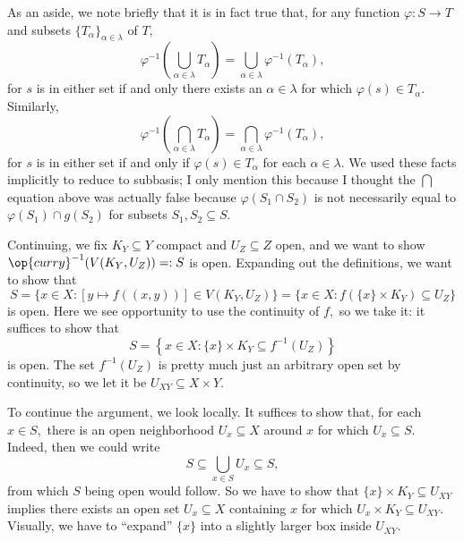 As an aside, we note briefly that it is in fact true that, for any function $\varphi:S\to T$ and subsets $\{T_\alpha\}_{\alpha\in\lambda}$ of $T,$
\[\varphi^{-1}\left(\bigcup_{\alpha\in\lambda}T_\alpha\right)=\bigcup_{\alpha\in\lambda}\varphi^{-1}(T_\alpha),\]
for $s$ is in either set if and only there exists an $\alpha\in\lambda$ for which $\varphi(s)\in T_\alpha.$ Similarly,
\[\varphi^{-1}\left(\bigcap_{\alpha\in\lambda}T_\alpha\right)=\bigcap_{\alpha\in\lambda}\varphi^{-1}(T_\alpha),\]
for $s$ is in either set if and only if $\varphi(s)\in T_\alpha$ for each $\alpha\in\lambda.$ We used these facts implicitly to reduce to subbasis; I only mention this because I thought the $\bigcap$ equation above was actually false because $\varphi(S_1\cap S_2)$ is not necessarily equal to $\varphi(S_1)\cap g(S_2)$ for subsets $S_1,S_2\subseteq S.$

Continuing, we fix $K_Y\subseteq Y$ compact and $U_Z\subseteq Z$ open, and we want to show $\op{curry}^{-1}(V(K_Y,U_Z))=:S$ is open. Expanding out the definitions, we want to show that
\[S=\{x\in X:[y\mapsto f((x,y))]\in V(K_Y,U_Z)\}=\{x\in X:f(\{x\}\times K_Y)\subseteq U_Z\}\]
is open. Here we see opportunity to use the continuity of $f,$ so we take it: it suffices to show that
\[S=\left\{x\in X:\{x\}\times K_Y\subseteq f^{-1}(U_Z)\right\}\]
is open. The set $f^{-1}(U_Z)$ is pretty much just an arbitrary open set by continuity, so we let it be $U_{XY}\subseteq X\times Y.$

To continue the argument, we look locally. It suffices to show that, for each $x\in S,$ there is an open neighborhood $U_x\subseteq X$ around $x$ for which $U_x\subseteq S.$ Indeed, then we could write
\[S\subseteq\bigcup_{x\in S}U_x\subseteq S,\]
from which $S$ being open would follow. So we have to show that $\{x\}\times K_Y\subseteq U_{XY}$ implies there exists an open set $U_x\subseteq X$ containing $x$ for which $U_x\times K_Y\subseteq U_{XY}.$ Visually, we have to ``expand'' $\{x\}$ into a slightly larger box inside $U_{XY}.$

